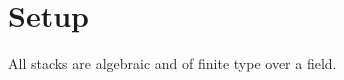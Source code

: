 \section{Setup}\label{Kre99-sec-1}

\begin{theorem}\label{Kre99-setup}
All stacks are algebraic and of finite type over a field.
\end{theorem}

